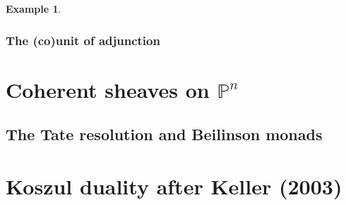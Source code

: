 \documentclass[a4paper]{article}
\theoremstyle{definition}
\newtheorem{example}[defn]{Example}
\theoremstyle{remark}
\newcommand{\Pn}{\ensuremath{\mathbb{P}^n}}
\begin{document}
\begin{example}
\end{example}

\subsubsection{The (co)unit of adjunction}

\section{Coherent sheaves on \Pn}\label{sec-cohPn}

\subsection{The Tate resolution and Beilinson monads}

\section{Koszul duality after Keller (2003)}\label{sec-keller}


\end{document}
